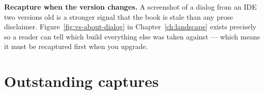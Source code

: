 \textbf{Recapture when the version changes.} A screenshot of a dialog from an IDE
two versions old is a stronger signal that the book is stale than any prose
disclaimer. Figure~\ref{fig:vs-about-dialog} in Chapter~\ref{ch:landscape} exists
precisely so a reader can tell which build everything else was taken against ---
which means it must be recaptured first when you upgrade.

\section{Outstanding captures}

\listofshots
